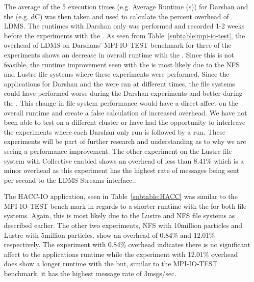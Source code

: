 The average of the 5 execution times (e.g. Average Runtime (s)) for Darshan and the \connector{} (e.g. dC) was then taken and used to calculate the percent overhead of LDMS. The runtimes with Darshan only was performed and recorded 1-2 weeks before the experiments with the \connector. As seen from Table~\ref{subtable:mpi-io-test}, the overhead of LDMS on Darshans' MPI-IO-TEST benchmark for three of the experiments shows an decrease in overall runtime with the \connector. Since this is not feasible, the runtime improvement seen with the \connector is most likely due to the NFS and Lustre file systems where these experiments were performed. Since the applications for Darshan and the \connector were ran at different times, the file systems could have performed worse during the Darshan experiments and better during the \connector. This change in file system performance would have a direct affect on the overall runtime and create a false calculation of increased overhead. We have not been able to test on a different cluster or have had the opportunity to interleave the experiments where each Darshan only run is followed by a \connector run. These experiments will be part of further research and understanding as to why we are seeing a performance improvement. The other experiment on the Lustre file system with Collective enabled shows an overhead of less than 8.41\% which is a minor overhead as this experiment has the highest rate of messages being sent per second to the LDMS Streams interface..   

The HACC-IO application, seen in Table~\ref{subtable:HACC} was similar to the MPI-IO-TEST bench mark in regards to a shorter runtime with the \connector for both file systems. Again, this is most likely due to the Lustre and NFS file systems as described earlier. The other two experiments, NFS with 10million particles and Lustre with 5million particles, show an overhead of 0.84\% and 12.01\% respectively. The experiment with 0.84\% overhead indicates there is no significant affect to the applications runtime while the experiment with 12.01\% overhead does show a longer runtime with the \connector but, similar to the MPI-IO-TEST benchmark, it has the highest message rate of 3msgs/sec.

